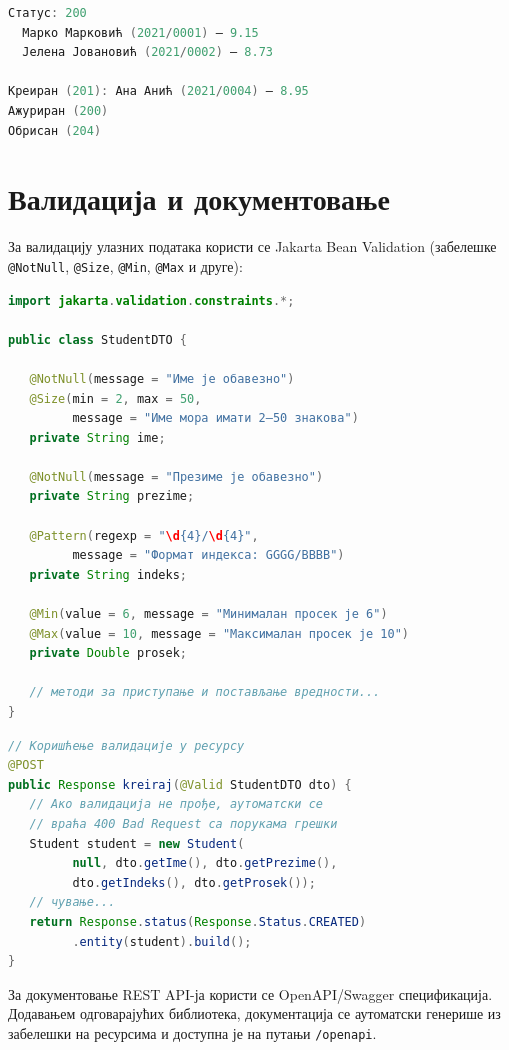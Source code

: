 \begin{lstlisting}[language=Java]
Статус: 200
  Марко Марковић (2021/0001) – 9.15
  Јелена Јовановић (2021/0002) – 8.73
 
Креиран (201): Ана Анић (2021/0004) – 8.95
Ажуриран (200)
Обрисан (204)
\end{lstlisting}


\section{Валидација и документовање}

За валидацију улазних података користи се Jakarta Bean Validation (забелешке \texttt{@NotNull}, \texttt{@Size}, \texttt{@Min}, \texttt{@Max} и друге):


\begin{lstlisting}[language=Java]
import jakarta.validation.constraints.*;
 
public class StudentDTO {
 
   @NotNull(message = "Име је обавезно")
   @Size(min = 2, max = 50,
         message = "Име мора имати 2–50 знакова")
   private String ime;
 
   @NotNull(message = "Презиме је обавезно")
   private String prezime;
 
   @Pattern(regexp = "\d{4}/\d{4}",
         message = "Формат индекса: GGGG/BBBB")
   private String indeks;
 
   @Min(value = 6, message = "Минималан просек је 6")
   @Max(value = 10, message = "Максималан просек је 10")
   private Double prosek;
 
   // методи за приступање и постављање вредности...
}
\end{lstlisting}


\begin{lstlisting}[language=Java]
// Коришћење валидације у ресурсу
@POST
public Response kreiraj(@Valid StudentDTO dto) {
   // Ако валидација не прође, аутоматски се
   // враћа 400 Bad Request са порукама грешки
   Student student = new Student(
         null, dto.getIme(), dto.getPrezime(),
         dto.getIndeks(), dto.getProsek());
   // чување...
   return Response.status(Response.Status.CREATED)
         .entity(student).build();
}
\end{lstlisting}


За документовање REST API-ја користи се OpenAPI/Swagger спецификација. Додавањем одговарајућих библиотека, документација се аутоматски генерише из забелешки на ресурсима и доступна је на путањи \texttt{/openapi}.


